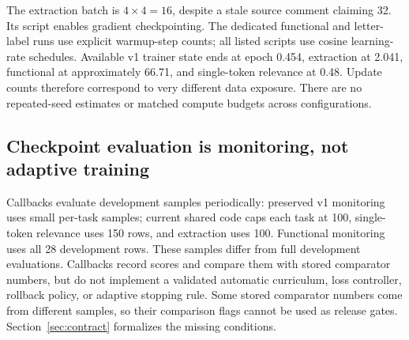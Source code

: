 The extraction batch is $4\times4=16$, despite a stale source comment claiming 32. Its script enables gradient checkpointing. The dedicated functional and letter-label runs use explicit warmup-step counts; all listed scripts use cosine learning-rate schedules. Available v1 trainer state ends at epoch 0.454, extraction at 2.041, functional at approximately 66.71, and single-token relevance at 0.48. Update counts therefore correspond to very different data exposure. There are no repeated-seed estimates or matched compute budgets across configurations.

\subsection{Checkpoint evaluation is monitoring, not adaptive training}
Callbacks evaluate development samples periodically: preserved v1 monitoring uses small per-task samples; current shared code caps each task at 100, single-token relevance uses 150 rows, and extraction uses 100. Functional monitoring uses all 28 development rows. These samples differ from full development evaluations. Callbacks record scores and compare them with stored comparator numbers, but do not implement a validated automatic curriculum, loss controller, rollback policy, or adaptive stopping rule. Some stored comparator numbers come from different samples, so their comparison flags cannot be used as release gates. Section~\ref{sec:contract} formalizes the missing conditions.
